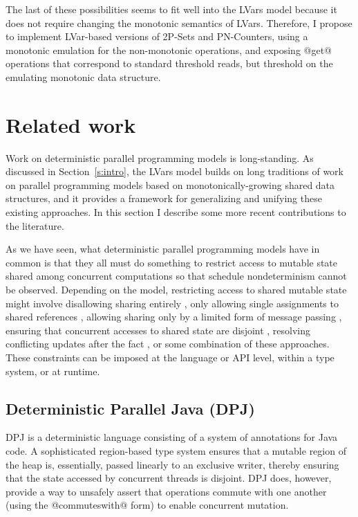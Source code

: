 \documentclass{article}
\begin{document}
The last of these possibilities seems to fit well into the LVars model
because it does not require changing the monotonic semantics of LVars.
Therefore, I propose to implement LVar-based versions of 2P-Sets and
PN-Counters, using a monotonic emulation for the non-monotonic
operations, and exposing @get@ operations that correspond to standard
threshold reads, but threshold on the emulating monotonic data
structure.

\section{Related work}\label{s:related}

Work on deterministic parallel programming models is long-standing.
As discussed in Section~\ref{s:intro}, the LVars model builds on long
traditions of work on parallel programming models based on
monotonically-growing shared data structures, and it provides a
framework for generalizing and unifying these existing approaches.  In
this section I describe some more recent contributions to the
literature.

As we have seen, what deterministic parallel programming models have
in common is that they all must do something to restrict access to
mutable state shared among concurrent computations so that schedule
nondeterminism cannot be observed.  Depending on the model,
restricting access to shared mutable state might involve disallowing
sharing entirely \cite{dph}, only allowing single assignments to
shared references \cite{Tesler-1968, IStructures, CnC}, allowing
sharing only by a limited form of message passing \cite{Kahn-1974},
ensuring that concurrent accesses to shared state are disjoint
\cite{dpj-oopsla}, resolving conflicting updates after the fact
\cite{concurrent-revisions-haskell11}, or some combination of these
approaches.  These constraints can be imposed at the language or API
level, within a type system, or at runtime.

\subsection{Deterministic Parallel Java (DPJ)}

DPJ \cite{dpj-oopsla, dpj-hotpar09} is a deterministic language
consisting of a system of annotations for Java code.  A sophisticated
region-based type system ensures that a mutable region of the heap is,
essentially, passed linearly to an exclusive writer, thereby ensuring
that the state accessed by concurrent threads is disjoint.  DPJ does,
however, provide a way to unsafely assert that operations commute with
one another (using the @commuteswith@ form) to enable concurrent
mutation.
\end{document}
